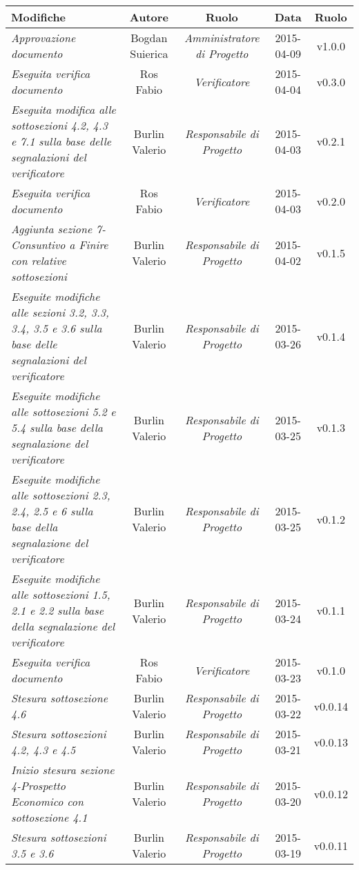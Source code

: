 \newpage

\begin{table}[h]
\centering
\begin{tabular}{|p{}|c|c|c|c|}
	\toprule
		\textbf{Modifiche} & \textbf{Autore} & \textbf{Ruolo} & \textbf{Data} & \textbf{Ruolo} \\
	\midrule
	\midrule
		\textit{Approvazione documento} & Bogdan Suierica & \textit{Amministratore di Progetto} & 2015-04-09 & v1.0.0 \\
	\midrule
		\textit{Eseguita verifica documento} & Ros Fabio & \textit{Verificatore} & 2015-04-04 & v0.3.0 \\
	\midrule
		\textit{Eseguita modifica alle sottosezioni 4.2, 4.3 e 7.1 sulla base delle segnalazioni del verificatore} & Burlin Valerio & \textit{Responsabile di Progetto} & 2015-04-03 & v0.2.1 \\
	\midrule
		\textit{Eseguita verifica documento} & Ros Fabio & \textit{Verificatore} & 2015-04-03 & v0.2.0 \\
	\midrule
		\textit{Aggiunta sezione 7-Consuntivo a Finire con relative sottosezioni} & Burlin Valerio & \textit{Responsabile di Progetto} & 2015-04-02 & v0.1.5 \\
	\midrule
		\textit{Eseguite modifiche alle sezioni 3.2, 3.3, 3.4, 3.5 e 3.6 sulla base delle segnalazioni del verificatore} & Burlin Valerio & \textit{Responsabile di Progetto} & 2015-03-26 & v0.1.4 \\
	\midrule
		\textit{Eseguite modifiche alle sottosezioni 5.2 e 5.4 sulla base della segnalazione del verificatore} & Burlin Valerio & \textit{Responsabile di Progetto} & 2015-03-25 & v0.1.3 \\
	\midrule
		\textit{Eseguite modifiche alle sottosezioni 2.3, 2.4, 2.5 e 6 sulla base della segnalazione del verificatore} & Burlin Valerio & \textit{Responsabile di Progetto} & 2015-03-25 & v0.1.2 \\
	\midrule
		\textit{Eseguite modifiche alle sottosezioni 1.5, 2.1 e 2.2 sulla base della segnalazione del verificatore} & Burlin Valerio & \textit{Responsabile di Progetto} & 2015-03-24 & v0.1.1 \\
	\midrule
		\textit{Eseguita verifica documento} & Ros Fabio & \textit{Verificatore} & 2015-03-23 & v0.1.0 \\
	\midrule
		\textit{Stesura sottosezione 4.6} & Burlin Valerio & \textit{Responsabile di Progetto} & 2015-03-22 & v0.0.14 \\
	\midrule
		\textit{Stesura sottosezioni 4.2, 4.3 e 4.5} & Burlin Valerio & \textit{Responsabile di Progetto} & 2015-03-21 & v0.0.13 \\
	\midrule
		\textit{Inizio stesura sezione 4-Prospetto Economico con sottosezione 4.1} & Burlin Valerio & \textit{Responsabile di Progetto} & 2015-03-20 & v0.0.12 \\
	\midrule
		\textit{Stesura sottosezioni 3.5 e 3.6} & Burlin Valerio & \textit{Responsabile di Progetto} & 2015-03-19 & v0.0.11 \\
	\bottomrule
\end{tabular}	
\end{table}

